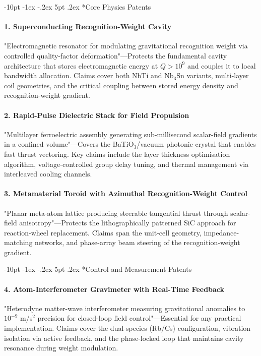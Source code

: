 \documentclass[12pt,letterpaper]{book}
\makeatletter
\renewcommand\section{\@startsection{section}{1}{\z@}%
  {-8pt \@plus -1ex \@minus -.2ex}%
  {4pt \@plus.2ex}%
  {\normalfont\large\bfseries}}
\renewcommand\section{\@startsection {section}{1}{\z@}%
                {-10pt \@plus -1ex \@minus -.2ex}%
                {5pt \@plus.2ex}%
                {\normalfont\large\bfseries}}
\makeatother
\begin{document}
\section*{Core Physics Patents}

\paragraph{1. Superconducting Recognition-Weight Cavity}
"Electromagnetic resonator for modulating gravitational recognition weight via controlled quality-factor deformation"—Protects the fundamental cavity architecture that stores electromagnetic energy at $Q>10^9$ and couples it to local bandwidth allocation.  Claims cover both NbTi and Nb$_3$Sn variants, multi-layer coil geometries, and the critical coupling between stored energy density and recognition-weight gradient.

\paragraph{2. Rapid-Pulse Dielectric Stack for Field Propulsion}
"Multilayer ferroelectric assembly generating sub-millisecond scalar-field gradients in a confined volume"—Covers the BaTiO$_3$/vacuum photonic crystal that enables fast thrust vectoring.  Key claims include the layer thickness optimisation algorithm, voltage-controlled group delay tuning, and thermal management via interleaved cooling channels.

\paragraph{3. Metamaterial Toroid with Azimuthal Recognition-Weight Control}
"Planar meta-atom lattice producing steerable tangential thrust through scalar-field anisotropy"—Protects the lithographically patterned SiC approach for reaction-wheel replacement.  Claims span the unit-cell geometry, impedance-matching networks, and phase-array beam steering of the recognition-weight gradient.

\section*{Control and Measurement Patents}

\paragraph{4. Atom-Interferometer Gravimeter with Real-Time Feedback}
"Heterodyne matter-wave interferometer measuring gravitational anomalies to $10^{-9}$ m/s$^2$ precision for closed-loop field control"—Essential for any practical implementation.  Claims cover the dual-species (Rb/Cs) configuration, vibration isolation via active feedback, and the phase-locked loop that maintains cavity resonance during weight modulation.
\end{document}
